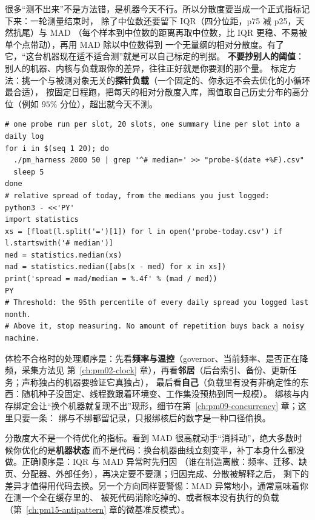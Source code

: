 \documentclass[12pt,a4paper,fontset=fandol]{ctexbook}
\newcommand{\Mx}[1]{\textsf{#1}}
\begin{document}
很多``测不出来''不是方法错，是机器今天不行。所以分散度要当成一个正式指标记下来：一轮测量结束时，
除了中位数还要留下 \Mx{IQR}（四分位距，\Mx{p75} 减 \Mx{p25}，天然抗尾）与 \Mx{MAD}
（每个样本到中位数的距离再取中位数，比 \Mx{IQR} 更稳、不易被单个点带动），再用 MAD 除以中位数得到
一个无量纲的相对分散度。有了它，``这台机器现在适不适合测''就是可以自己标定的判据。
\textbf{不要抄别人的阈值}：别人的机器、内核与负载跟你的差异，往往正好就是你要测的那个量。
标定方法：挑一个与被测对象无关的\textbf{探针负载}（一个固定的、你永远不会去优化的小循环最合适），
按固定日程跑，把每天的相对分散度入库，阈值取自己历史分布的高分位（例如 $95\%$ 分位），超出就今天不测。

\begin{lstlisting}[style=shellstyle, caption={\textbf{可跑}：机器体检记录的采集与判读骨架（阈值来自你自己的历史分布，不给任何实测数值）}, label={lst:pm03-probe}]
# one probe run per slot, 20 slots, one summary line per slot into a daily log
for i in $(seq 1 20); do
  ./pm_harness 2000 50 | grep '^# median=' >> "probe-$(date +%F).csv"
  sleep 5
done
# relative spread of today, from the medians you just logged:
python3 - <<'PY'
import statistics
xs = [float(l.split('=')[1]) for l in open('probe-today.csv') if l.startswith('# median')]
med = statistics.median(xs)
mad = statistics.median([abs(x - med) for x in xs])
print('spread = mad/median = %.4f' % (mad / med))
PY
# Threshold: the 95th percentile of every daily spread you logged last month.
# Above it, stop measuring. No amount of repetition buys back a noisy machine.
\end{lstlisting}

体检不合格时的处理顺序是：先看\textbf{频率与温控}（governor、当前频率、是否正在降频，采集方法见
第~\ref{ch:pm02-clock} 章），再看\textbf{邻居}（后台索引、备份、更新任务；声称独占的机器要验证它真独占），
最后看\textbf{自己}（负载里有没有非确定性的东西：随机种子没固定、线程数跟着环境变、工作集没预热到同一规模）。
绑核与内存绑定会让``换个机器就复现不出''现形，细节在第~\ref{ch:pm09-concurrency} 章；这里只要一条：
绑与不绑都留记录，只报绑核后的数字是一种口径偷换。

\begin{warning}[title={把方差当成优化空间}, label={box:pm03-variance}]
分散度大不是一个待优化的指标。看到 MAD 很高就动手``消抖动''，绝大多数时候你优化的是\textbf{机器状态}
而不是代码：换台机器曲线立刻变平，补丁本身什么都没做。正确顺序是：\Mx{IQR} 与 \Mx{MAD} 异常时先归因
（谁在制造离散：频率、迁移、缺页、分配器、外部任务），再决定要不要测；归因完成、分散被解释之后，
剩下的差异才值得用代码去换。另一个方向同样要警惕：\Mx{MAD} 异常地小，通常意味着你在测一个全在缓存里的、
被死代码消除吃掉的、或者根本没有执行的负载（第~\ref{ch:pm15-antipattern} 章的微基准反模式）。
\end{warning}
\end{document}
